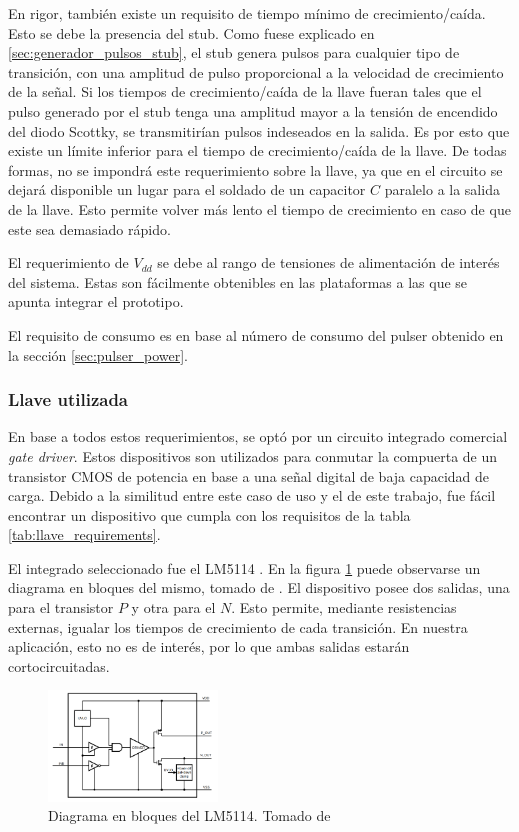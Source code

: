 En rigor, también existe un requisito de tiempo mínimo de crecimiento/caída.
Esto se debe la presencia del stub. Como fuese explicado en
\ref{sec:generador_pulsos_stub}, el stub genera pulsos para cualquier tipo de
transición, con una amplitud de pulso proporcional a la velocidad de crecimiento
de la señal. Si los tiempos de crecimiento/caída de la llave fueran tales que el
pulso generado por el stub tenga una amplitud mayor a la tensión de encendido
del diodo Scottky, se transmitirían pulsos indeseados en la salida. Es por esto que
existe un límite inferior para el tiempo de crecimiento/caída de la llave. De
todas formas, no se impondrá  este requerimiento sobre la llave, ya que en el
circuito se dejará disponible un lugar para el soldado de un capacitor $C$
paralelo a la salida de la llave. Esto permite volver más lento el tiempo de
crecimiento en caso de que este sea demasiado rápido.

El requerimiento de $V_{dd}$ se debe al rango de tensiones de alimentación de
interés del sistema. Estas son fácilmente obtenibles en las plataformas a las
que se apunta integrar el prototipo.

El requisito de consumo es en base al número de consumo del pulser obtenido en
la sección \ref{sec:pulser_power}.

\subsubsection{Llave utilizada}

En base a todos estos requerimientos, se optó por un circuito integrado
comercial \textit{gate driver}. Estos dispositivos son utilizados para conmutar
la compuerta de un transistor CMOS de potencia en base a una señal digital de
baja capacidad de carga. Debido a la similitud entre este caso de uso y el de
este trabajo, fue fácil encontrar un dispositivo que cumpla con los requisitos
de la tabla \ref{tab:llave_requirements}.

El integrado seleccionado fue el LM5114 \cite{LM5114_datasheet}. En la figura
\ref{fig:lm5114_block_diagram} puede observarse un diagrama en bloques del
mismo, tomado de \cite{LM5114_datasheet}. El dispositivo posee dos salidas, una
para el transistor $P$ y otra para el $N$. Esto permite, mediante resistencias
externas, igualar los tiempos de crecimiento de cada transición. En nuestra
aplicación, esto no es de interés, por  lo que ambas salidas estarán
cortocircuitadas.

\begin{figure}[tbp]
    \centering
    \includegraphics[width=0.4\textwidth]{images/lm5114_block_diagram.png}
    \caption{Diagrama en bloques del LM5114. Tomado de \cite{LM5114_datasheet}}
    \label{fig:lm5114_block_diagram}
\end{figure}

